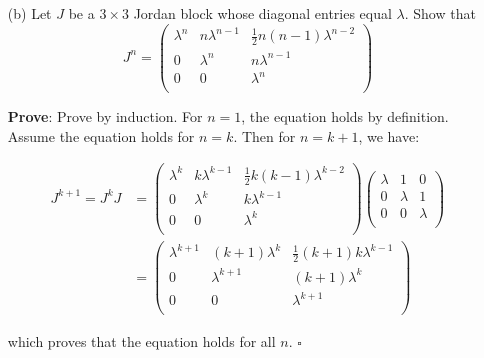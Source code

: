 \documentclass{article}
\begin{document}
\begin{enumerate}
\begin{enumerate}
        \item[(b)] Let $J$ be a $3 \times 3$ Jordan block whose diagonal entries equal $\lambda$. Show that
        $$ J^n = 
        \begin{pmatrix}
            \lambda^n & n\lambda^{n-1} & \frac{1}{2}n(n-1)\lambda^{n-2} \\
            0 & \lambda^{n} & n\lambda^{n-1} \\
            0 & 0 & \lambda^n \\
        \end{pmatrix}
        $$
        
        \textbf{Prove}: Prove by induction. For $n=1$, the equation holds by definition. Assume the equation holds for $n=k$. Then for $n=k+1$, we have:
        
        \begin{align*}
        J^{k+1} = J^k J &= 
        \begin{pmatrix}
            \lambda^k & k\lambda^{k-1} & \frac{1}{2}k(k-1)\lambda^{k-2} \\
            0 & \lambda^{k} & k\lambda^{k-1} \\
            0 & 0 & \lambda^k \\
        \end{pmatrix}
        \begin{pmatrix}
            \lambda & 1 & 0 \\
            0 & \lambda & 1 \\
            0 & 0 & \lambda \\
        \end{pmatrix}\\
        &= 
        \begin{pmatrix}
            \lambda^{k+1} & (k+1)\lambda^{k} & \frac{1}{2}(k+1)k\lambda^{k-1} \\
            0 & \lambda^{k+1} & (k+1)\lambda^{k} \\
            0 & 0 & \lambda^{k+1} \\
        \end{pmatrix}
        \end{align*}
        
        which proves that the equation holds for all $n$. \flushright $\square$
        
    \end{enumerate}
\end{enumerate}
\end{document}
